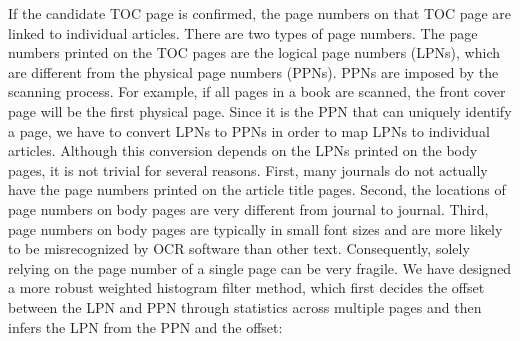 \documentclass[10pt]{article}
\begin{document}
If the candidate TOC page is confirmed, the page numbers on that TOC page are linked to individual articles. There are two types of page numbers. The page numbers printed on the TOC pages are the logical page numbers (LPNs), which are different from the physical page numbers (PPNs). PPNs are imposed by the scanning process. For example, if all pages in a book are scanned, the front cover page will be the first physical page. Since it is the PPN that can uniquely identify a page, we have to convert LPNs to PPNs in order to map LPNs to individual articles. Although this conversion depends on the LPNs printed on the body pages, it is not trivial for several reasons. First, many journals do not actually have the page numbers printed on the article title pages. Second, the locations of page numbers on body pages are very different from journal to journal. Third, page numbers on body pages are typically in small font sizes and are more likely to be misrecognized by OCR software than other text. Consequently, solely relying on the page number of a single page can be very fragile. We have designed a more robust weighted histogram filter method, which first decides the offset between the LPN and PPN through statistics across multiple pages and then infers the LPN from the PPN and the offset:
\end{document}
